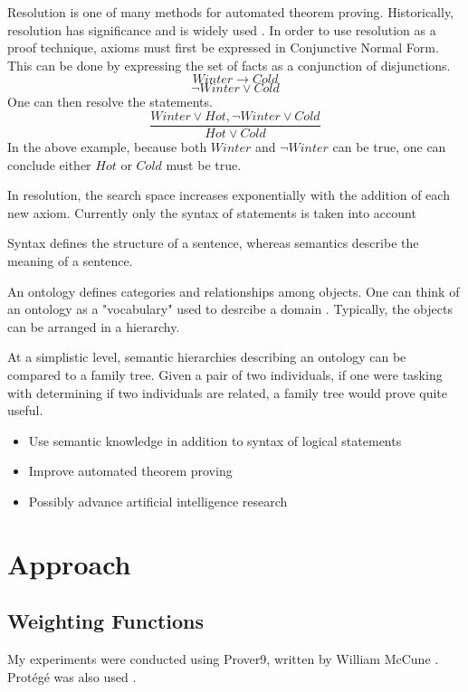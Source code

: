 \documentclass{article}
\begin{document}
Resolution is one of many methods for automated theorem proving. Historically, resolution has significance and is widely used \cite[51]{ertel2018introduction}.
In order to use resolution as a proof technique, axioms must first be expressed in Conjunctive Normal Form. This can be done by expressing the set of facts as a conjunction of disjunctions. 
		\[Winter \rightarrow Cold\]
		\[\lnot Winter \lor Cold\]
		One can then resolve the statements. 
		\[\frac{Winter \lor Hot, \lnot Winter \lor Cold}{Hot \lor Cold}\]
		In the above example, because both $Winter$ and $\lnot Winter $ can be true, one can conclude either $Hot$ or $Cold$ must be true. 
		

In resolution, the search space increases exponentially with the addition of each new axiom. 
Currently only the syntax of statements is taken into account

	

        Syntax defines the structure of a sentence, whereas semantics describe the meaning of a sentence. 
	

		An ontology defines categories and relationships among objects.
		One can think of an ontology as a "vocabulary" used to desrcibe a domain \cite[308]{russell2016artificial}. Typically, the objects can be arranged in a hierarchy. 
		
	At a simplistic level, semantic hierarchies describing an ontology can be compared to a family tree. Given a pair of two individuals, if one were tasking with determining if two individuals are related, a family tree would prove quite useful. 

	
		\begin{itemize}
		    \item Use semantic knowledge in addition to syntax of logical statements
		    \item Improve automated theorem proving
		    \item Possibly advance artificial intelligence research
		\end{itemize}

	\newpage	
	\section{Approach}
		\subsection{Weighting Functions}
My experiments were conducted using Prover9, written by William McCune \cite{mccune2005prover9}. Prot{\'e}g{\'e} was also used \cite{gennari2003evolution}.
\end{document}
